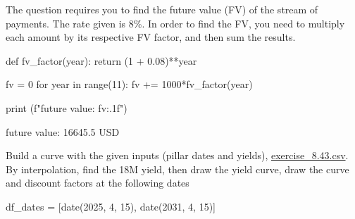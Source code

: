 \cprotEnv\begin{solution}
The question requires you to find the future value (FV) of the stream of payments. The rate given is 8\%. In order to find the FV, you need to multiply each amount by its respective FV factor, and then sum the results.
	
\begin{ipython}
def fv_factor(year):
    return (1 + 0.08)**year
		
fv = 0
for year in range(11):
    fv += 1000*fv_factor(year)
		
print (f"future value: {fv:.1f}")
\end{ipython}
\begin{ioutput}
future value: 16645.5 USD
\end{ioutput}
\end{solution}

\cprotEnv\begin{question}
\label{ex:yield_discount}
Build a curve with the given inputs (pillar dates and yields), \href{https://raw.githubusercontent.com/matteosan1/finance_course/develop/input_files/exercise_8.43.csv}{exercise\_8.43.csv}.
By interpolation, find the 18M yield, then draw the yield curve, draw the curve and discount factors at the following dates
\begin{ipython}
df_dates = [date(2025, 4, 15), date(2031, 4, 15)]
\end{ipython}
\end{question}

